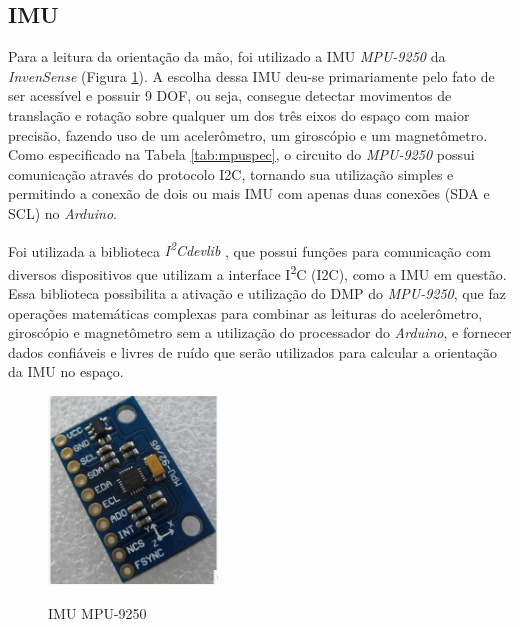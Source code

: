 \subsection{\ac{IMU}}
\label{sub:mpu}
Para a leitura da orientação da mão, foi utilizado a \ac{IMU} \textit{MPU-9250} da \textit{InvenSense} (Figura \ref{fig:mpu9250}). A escolha dessa \ac{IMU} deu-se primariamente pelo fato de ser acessível e possuir 9 \ac{DOF}, ou seja, consegue detectar movimentos de translação e rotação sobre qualquer um dos três eixos do espaço com maior precisão, fazendo uso de um acelerômetro, um giroscópio e um magnetômetro. Como especificado na Tabela \ref{tab:mpuspec}, o circuito do \textit{MPU-9250} possui comunicação através do protocolo \ac{I2C}, tornando sua utilização simples e permitindo a conexão de dois ou mais \ac{IMU} com apenas duas conexões (\ac{SDA} e \ac{SCL}) no \textit{Arduino}.

Foi utilizada a biblioteca \textit{I\textsuperscript{2}Cdevlib} \cite{i2c}, que possui funções para comunicação com diversos dispositivos que utilizam a interface I\textsuperscript{2}C (\ac{I2C}), como a \ac{IMU} em questão. Essa biblioteca possibilita a ativação e utilização do \ac{DMP} do \textit{MPU-9250}, que faz operações matemáticas complexas para combinar as leituras do acelerômetro, giroscópio e magnetômetro sem a utilização do processador do \textit{Arduino}, e fornecer dados confiáveis e livres de ruído que serão utilizados para calcular a orientação da \ac{IMU} no espaço.

\begin{figure}[H]
  \setlength{\abovecaptionskip}{0pt}
  \setlength{\belowcaptionskip}{0pt}
  \caption[\ac{IMU} MPU-9250]{\ac{IMU} MPU-9250}
  \centering
  \includegraphics[height=5cm]{imagem/mpu9250}
  \captionsetup{justification=centering}
  \label{fig:mpu9250}
\end{figure}

